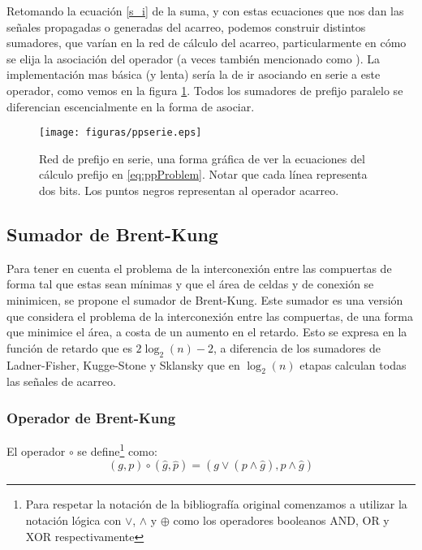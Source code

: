 Retomando la ecuación \ref{s_i} de la suma, y con estas ecuaciones que nos dan las señales propagadas o generadas del acarreo, podemos construir distintos sumadores, que varían en la red de cálculo del acarreo, particularmente en cómo se elija la asociación del operador  (a veces también mencionado como ). La implementación mas básica (y lenta) sería la de ir asociando en serie a este operador, como vemos en la figura \ref{fig:ppserie}. Todos los sumadores de prefijo paralelo se diferencian escencialmente en la forma de asociar.
\begin{figure}[h!]
  \centering
\texttt{[image: figuras/ppserie.eps]}
  \caption{Red de prefijo en serie, una forma gráfica de ver la ecuaciones del cálculo prefijo en \ref{eq:ppProblem}. Notar que cada línea representa dos bits. Los puntos negros representan al operador acarreo.}
\label{fig:ppserie}
\end{figure}



\subsection {Sumador de Brent-Kung}
Para tener en cuenta el problema de la interconexión entre las compuertas de forma tal que estas sean mínimas y que el área de celdas y de conexión se minimicen, se propone el sumador de Brent-Kung\cite{brent-kung}. Este sumador es una versión que considera el problema de la interconexión entre las compuertas, de una forma que minimice el área, a costa de un aumento en el retardo. Esto se expresa en la función de retardo que es \(2\log_2(n)-2\), a diferencia de los sumadores de Ladner-Fisher\cite{ladner-fischer}, Kugge-Stone\cite{kogge-stone} y Sklansky\cite{sklansky} que en \(\log_2(n)\) etapas calculan todas las señales de acarreo. 


\subsubsection {Operador de Brent-Kung}
El operador $\circ$ se define\footnote{Para respetar la notación de la bibliografía original comenzamos a utilizar la notación lógica con \(\vee\), \(\wedge\) y \(\oplus\) como los operadores booleanos AND, OR y XOR respectivamente} como:
\begin{equation}
(g,p) \circ (\hat{g},\hat{p}) = (g\vee(p\wedge\hat{g}),p\wedge\hat{g})\label{gap}
\end{equation}

